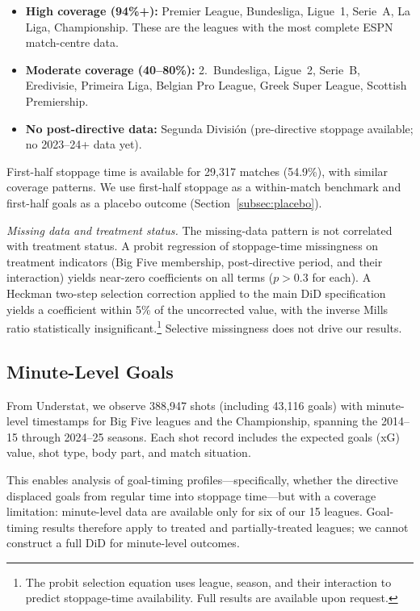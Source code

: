\documentclass[12pt]{article}
\begin{document}
\begin{itemize}[leftmargin=*]
\item \textbf{High coverage (94\%+):} Premier League, Bundesliga, Ligue~1, Serie~A, La Liga, Championship. These are the leagues with the most complete ESPN match-centre data.
\item \textbf{Moderate coverage (40--80\%):} 2.~Bundesliga, Ligue~2, Serie~B, Eredivisie, Primeira Liga, Belgian Pro League, Greek Super League, Scottish Premiership.
\item \textbf{No post-directive data:} Segunda Divisi\'{o}n (pre-directive stoppage available; no 2023--24+ data yet).
\end{itemize}

First-half stoppage time is available for 29,317 matches (54.9\%), with similar coverage patterns. We use first-half stoppage as a within-match benchmark and first-half goals as a placebo outcome (Section~\ref{subsec:placebo}).

\textit{Missing data and treatment status.} The missing-data pattern is not correlated with treatment status. A probit regression of stoppage-time missingness on treatment indicators (Big Five membership, post-directive period, and their interaction) yields near-zero coefficients on all terms ($p > 0.3$ for each). A Heckman two-step selection correction \citep{heckman1979sample} applied to the main DiD specification yields a coefficient within 5\% of the uncorrected value, with the inverse Mills ratio statistically insignificant.\footnote{The probit selection equation uses league, season, and their interaction to predict stoppage-time availability. Full results are available upon request.} Selective missingness does not drive our results.

\subsection{Minute-Level Goals}

From Understat, we observe 388,947 shots (including 43,116 goals) with minute-level timestamps for Big Five leagues and the Championship, spanning the 2014--15 through 2024--25 seasons. Each shot record includes the expected goals (xG) value, shot type, body part, and match situation.

This enables analysis of goal-timing profiles---specifically, whether the directive displaced goals from regular time into stoppage time---but with a coverage limitation: minute-level data are available only for six of our 15 leagues. Goal-timing results therefore apply to treated and partially-treated leagues; we cannot construct a full DiD for minute-level outcomes.
\end{document}
